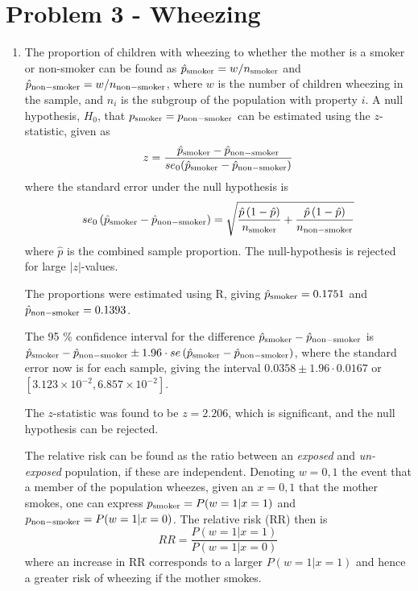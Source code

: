 \documentclass[a4paper,11pt]{article}
\begin{document}
\section*{Problem 3 - Wheezing}
\begin{enumerate}[label=\alph*)]
    \item  The proportion of children with wheezing to whether the mother is a smoker or non-smoker can be found as $\hat{p}_{\rm smoker} = w / n_{\rm smoker}$ and  $\hat{p}_{\rm non-smoker} = w / n_{\rm non-smoker}$, where $w$ is the number of children wheezing in the sample, and $n_i$ is the subgroup of the population with property $i$. A null hypothesis, $H_0$, that $p_{\rm smoker} = p_{\rm non-smoker}$ can be estimated using the $z$-statistic, given as
        \begin{equation}
            z = \frac{\hat{p}_{\rm smoker} - \hat{p}_{\rm non-smoker}}{se_0(\hat{p}_{\rm smoker} - \hat{p}_{\rm non-smoker} ) }
            \label{eq:z_statistic}
        \end{equation}
        where the standard error under the null hypothesis is
        \begin{equation}
            se_0 \left( \hat{p}_{\rm smoker} - \hat{p}_{\rm non-smoker} \right) = \sqrt{ \frac{\hat{p} \left( 1 - \hat{p} \right)}{n_{\rm smoker}} + \frac{\hat{p}\left( 1- \hat{p} \right)}{n_{\rm non-smoker}}  }
            \label{eq:se_0}
        \end{equation}
        where $\hat{p}$ is the combined sample proportion. The null-hypothesis is rejected for large $|z|$-values.

        The proportions were estimated using R, giving $\hat{p}_{\rm smoker} = 0.1751$ and $\hat{p}_{\rm non-smoker} = 0.1393$.

        The 95 \% confidence interval for the difference $\hat{p}_{\rm smoker} - \hat{p}_{\rm non-smoker}$ is $\hat{p}_{\rm smoker} - \hat{p}_{\rm non-smoker} \pm 1.96 \cdot se \left( \hat{p}_{\rm smoker} - \hat{p}_{\rm non-smoker} \right)$, where the standard error now is for each sample, giving the interval $0.0358 \pm 1.96 \cdot 0.0167$ or $[3.123 \times 10^{-2}, 6.857 \times 10^{-2}]$.

        The $z$-statistic was found to be $z = 2.206$, which is significant, and the null hypothesis can be rejected.

        The relative risk can be found as the ratio between an \textit{exposed} and \textit{un-exposed} population, if these are independent. Denoting $w = 0,1$ the event that a member of the population wheezes, given an $x = 0,1$ that the mother smokes, one can express $p_{\rm smoker} = P( w=1 | x=1 )$ and $p_{\rm non-smoker} = P( w=1 | x=0)$. The relative risk (RR) then is
        \begin{equation}
            RR = \frac{P\left( w=1 | x=1 \right)}{P\left( w=1 | x=0 \right)}
            \label{eq:RR}
        \end{equation}
        where an increase in RR corresponds to a larger $P(w=1 | x=1)$ and hence a greater risk of wheezing if the mother smokes.


\end{enumerate}
\end{document}
